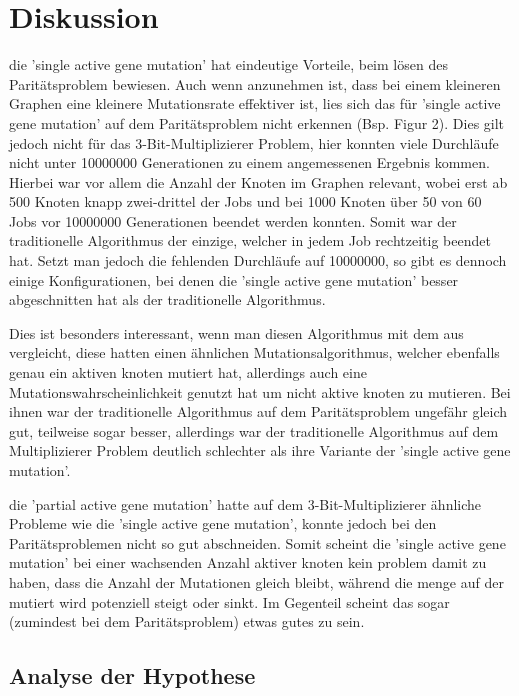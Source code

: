 \section{Diskussion}


die 'single active gene mutation' hat eindeutige Vorteile, beim lösen des Paritätsproblem bewiesen. Auch wenn anzunehmen ist, dass bei einem kleineren Graphen eine kleinere Mutationsrate effektiver ist, lies sich das für 'single active gene mutation' auf dem Paritätsproblem nicht erkennen (Bsp. Figur 2). Dies gilt jedoch nicht für das 3-Bit-Multiplizierer Problem, hier konnten viele Durchläufe nicht unter 10000000 Generationen zu einem angemessenen Ergebnis kommen. Hierbei war vor allem die Anzahl der Knoten im Graphen relevant, wobei erst ab 500 Knoten knapp zwei-drittel der Jobs und bei 1000 Knoten über 50 von 60 Jobs vor 10000000 Generationen beendet werden konnten. Somit war der traditionelle Algorithmus der einzige, welcher in jedem Job rechtzeitig beendet hat. Setzt man jedoch die fehlenden Durchläufe auf 10000000, so gibt es dennoch einige Konfigurationen, bei denen die 'single active gene mutation' besser abgeschnitten hat als der traditionelle Algorithmus. 

Dies ist besonders interessant, wenn man diesen Algorithmus mit dem aus 
vergleicht, diese hatten einen ähnlichen Mutationsalgorithmus, welcher ebenfalls genau ein aktiven knoten mutiert hat, allerdings auch eine Mutationswahrscheinlichkeit genutzt hat um nicht aktive knoten zu mutieren. Bei ihnen war der traditionelle Algorithmus auf dem Paritätsproblem ungefähr gleich gut, teilweise sogar besser, allerdings war der traditionelle Algorithmus auf dem Multiplizierer Problem deutlich schlechter als ihre Variante der 'single active gene mutation'. 


die 'partial active gene mutation' hatte auf dem 3-Bit-Multiplizierer ähnliche Probleme wie die 'single active gene mutation', konnte jedoch bei den Paritätsproblemen nicht so gut abschneiden. Somit scheint die 'single active gene mutation' bei einer wachsenden Anzahl aktiver knoten kein problem damit zu haben, dass die Anzahl der Mutationen gleich bleibt, während die menge auf der mutiert wird potenziell steigt oder sinkt. Im Gegenteil scheint das sogar (zumindest bei dem Paritätsproblem) etwas gutes zu sein. 

\subsection{Analyse der Hypothese}

